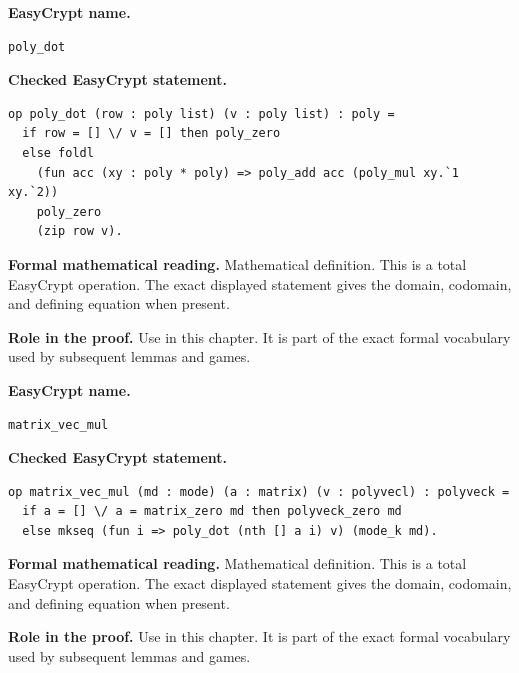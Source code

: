 \begin{formaldefinition}
\noindent\textbf{EasyCrypt name.}
\begin{lstlisting}[language=EasyCrypt,basicstyle=\ttfamily\scriptsize]
poly_dot
\end{lstlisting}
\noindent\textbf{Checked EasyCrypt statement.}
\begin{lstlisting}[language=EasyCrypt,basicstyle=\ttfamily\scriptsize]
op poly_dot (row : poly list) (v : poly list) : poly =
  if row = [] \/ v = [] then poly_zero
  else foldl
    (fun acc (xy : poly * poly) => poly_add acc (poly_mul xy.`1 xy.`2))
    poly_zero
    (zip row v).
\end{lstlisting}
\noindent\textbf{Formal mathematical reading.}
Mathematical definition. This is a total EasyCrypt operation.  The exact displayed statement gives the domain, codomain, and defining equation when present.

\noindent\textbf{Role in the proof.}
Use in this chapter. It is part of the exact formal vocabulary used by subsequent lemmas and games.

\end{formaldefinition}

\begin{formaldefinition}
\noindent\textbf{EasyCrypt name.}
\begin{lstlisting}[language=EasyCrypt,basicstyle=\ttfamily\scriptsize]
matrix_vec_mul
\end{lstlisting}
\noindent\textbf{Checked EasyCrypt statement.}
\begin{lstlisting}[language=EasyCrypt,basicstyle=\ttfamily\scriptsize]
op matrix_vec_mul (md : mode) (a : matrix) (v : polyvecl) : polyveck =
  if a = [] \/ a = matrix_zero md then polyveck_zero md
  else mkseq (fun i => poly_dot (nth [] a i) v) (mode_k md).
\end{lstlisting}
\noindent\textbf{Formal mathematical reading.}
Mathematical definition. This is a total EasyCrypt operation.  The exact displayed statement gives the domain, codomain, and defining equation when present.

\noindent\textbf{Role in the proof.}
Use in this chapter. It is part of the exact formal vocabulary used by subsequent lemmas and games.

\end{formaldefinition}

